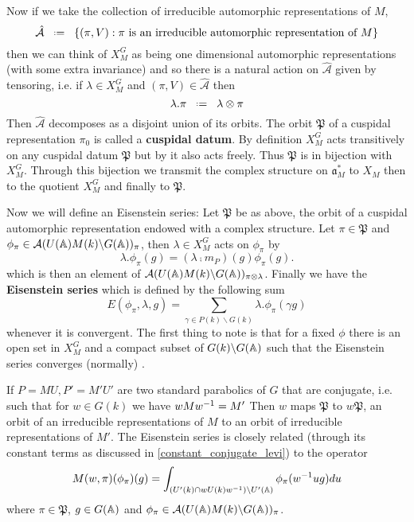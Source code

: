Now if we take the collection of irreducible automorphic representations of \(M\),
 \[\hat{\mathcal{A}} \defeq \{(\pi, V) : \pi \text{ is an irreducible automorphic representation of }M\}\]
then we can think of \(X_M^G\) as being one dimensional automorphic representations (with some extra invariance) and so there is a natural action on \(\hat{\mathcal{A}}\) given by tensoring, i.e. if \(\lambda\in X_M^G\) and \((\pi, V)\in \hat{\mathcal{A}}\) then 
\[\lambda.\pi \defeq \lambda\tensor \pi\]
Then \(\hat{\mathcal{A}}\) decomposes as a disjoint union of its orbits. The orbit \(\mathfrak{P}\) of a cuspidal representation \(\pi_0\) is called a \textbf{cuspidal datum}. By definition \(X_M^G\) acts transitively on any cuspidal datum \(\mathfrak{P}\) but by \cite[II.1]{moeglinSpectralDecompositionEisenstein1995} it also acts freely. Thus \(\mathfrak{P}\) is in bijection with \(X_M^G\). Through this bijection we transmit the complex structure on \(\mathfrak{a}_M^*\) to \(X_M\) then to the quotient \(X_M^G\) and finally to \(\mathfrak{P}\).

Now we will define an Eisenstein series: Let \(\mathfrak{P}\) be as above, the orbit of a cuspidal automorphic representation endowed with a complex structure. Let \(\pi\in \mathfrak{P}\) and \(\phi_\pi \in \mathcal{A}(U(\A)M(k)\backslash G(\A))_\pi\), then \(\lambda\in X_M^G\) acts on \(\phi_\pi\) by 
\[\lambda.\phi_\pi(g) = (\lambda \comp m_P)(g) \phi_\pi(g).\]
which is then an element of \(\mathcal{A}(U(\A)M(k)\backslash G(\A))_{\pi\tensor \lambda}\). Finally we have the \textbf{Eisenstein series} which is defined by the following sum
\[E(\phi_\pi, \lambda, g) = \sum_{\gamma \in P(k)\backslash G(k)} \lambda.\phi_\pi(\gamma g)\]
whenever it is convergent. The first thing to note is that for a fixed \(\phi\) there is an open set in \(X_M^G\) and a compact subset of \(G(k)\backslash G(\A)\) such that the Eisenstein series converges (normally) \cite[II.1.5]{moeglinSpectralDecompositionEisenstein1995}.

If \(P = MU, P' = M'U'\) are two standard parabolics of \(G\) that are conjugate, i.e. such that for \(w\in G(k)\) we have \(wMw^{-1} = M'\)
Then \(w\) maps \(\mathfrak{P}\) to \(w\mathfrak{P}\), an orbit of an irreducible representations of \(M\) to an orbit of irreducible representations of \(M'\).
The Eisenstein series is closely related (through its constant terms as discussed in \ref{constant_conjugate_levi}) to the operator
\[M(w, \pi)(\phi_\pi)(g) = \int_{(U'(k)\cap wU(k)w\inv )\backslash U'(\A)} \phi_\pi(w\inv ug) du\]
where \(\pi\in \mathfrak{P}\), \(g\in G(\A)\) and \(\phi_\pi \in \mathcal{A}(U(\A)M(k)\backslash G(\A))_\pi\).

